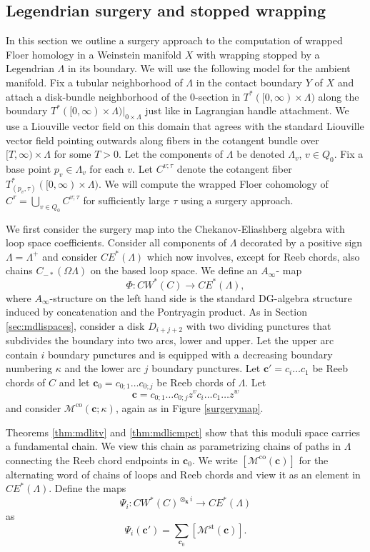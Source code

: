 \documentclass{gtpart}
\renewcommand{\k}{\mathbf{k}}
\renewcommand{\co}{\mathrm{co}}
\newcommand{\st}{\mathrm{st}}
\begin{document}
\subsection{Legendrian surgery and stopped wrapping}\label{ssec:CWpwrap}
In this section we outline a surgery approach to the computation of wrapped Floer homology in a
Weinstein manifold $X$ with wrapping stopped by a Legendrian $\Lambda$ in its boundary. We will use
the following model for the ambient manifold. Fix a tubular neighborhood of $\Lambda$ in the contact
boundary $Y$ of $X$ and attach a disk-bundle neighborhood of the $0$-section in
$T^{\ast}([0,\infty)\times\Lambda)$ along the boundary
$T^{\ast}([0,\infty)\times\Lambda)|_{0\times\Lambda}$ just like in Lagrangian handle attachment. We
use a Liouville vector field on this domain that agrees with the standard Liouville vector field
pointing outwards along fibers in the cotangent bundle over $[T,\infty)\times\Lambda$ for some
$T>0$. Let the components of $\Lambda$ be denoted $\Lambda_{v}$, $v\in Q_{0}$. Fix a base point
$p_v \in\Lambda_v$ for each $v$. Let $C^{v;\tau}$ denote the cotangent fiber $T^{\ast}_{(p_{v},\tau)}([0,\infty)\times\Lambda)$. We will compute the wrapped Floer cohomology of $C^{\tau}=\bigcup_{v\in Q_{0}}C^{v;\tau}$ for sufficiently large $\tau$ using a surgery approach. 

We first consider the surgery map into the Chekanov-Eliashberg algebra with loop space coefficients.
Consider all components of $\Lambda$ decorated by a positive sign $\Lambda=\Lambda^{+}$ and consider $CE^{\ast}(\Lambda)$ which now involves, except for Reeb chords, also chains $C_{-\ast}(\Omega\Lambda)$ on the based loop space. We define an $A_{\infty}$- map
\[ 
\Phi\colon CW^{\ast}(C)\to CE^{\ast}(\Lambda),
\]
where $A_{\infty}$-structure on the left hand side is the standard DG-algebra structure induced by concatenation and the Pontryagin product.  
As in Section \ref{sec:mdlispaces}, consider a disk $D_{i+j+2}$ with two dividing punctures that subdivides the boundary into two arcs, lower and upper. Let the upper arc contain $i$ boundary punctures and is equipped with a decreasing boundary numbering $\kappa$ and the lower arc $j$ boundary punctures. Let $\mathbf{c}'=c_{i}\dots c_{1}$ be Reeb chords of $C$ and let $\mathbf{c}_{0}=c_{0;1}\dots c_{0;j}$ be Reeb chords of $\Lambda$. Let
\[ 
\mathbf{c}= c_{0;1}\dots c_{0;j} z^{v} c_{i}\dots c_{1}\dots z^{w}
\]  
and consider $\mathcal{M}^{\co}(\mathbf{c};\kappa)$, again as in Figure \ref{surgerymap}.

Theorems \ref{thm:mdlitv} and \ref{thm:mdlicmpct} show that this moduli space carries a fundamental
chain. We view this chain as parametrizing chains of paths in $\Lambda$ connecting the Reeb chord
endpoints in $\mathbf{c}_{0}$. We write $[\mathcal{M}^{\co}(\mathbf{c})]$ for the alternating word
of chains of loops and Reeb chords and view it as an element in $CE^{\ast}(\Lambda)$. Define the maps 
\[ 
\Psi_{i}\colon CW^{\ast}(C)^{\otimes_\k i}\to CE^{\ast}(\Lambda)
\]
as 
\[ 
\Psi_{i}(\mathbf{c}')=\sum_{\mathbf{c}_{0}}[\mathcal{M}^{\st}(\mathbf{c})].
\]   
\end{document}
